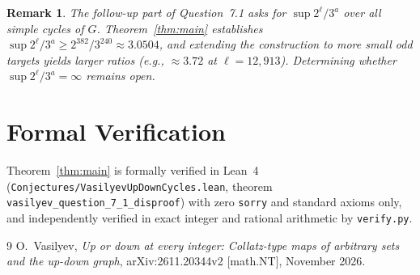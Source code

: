 \documentclass[11pt]{article}
\newtheorem{remark}[theorem]{Remark}
\begin{document}
\begin{remark}
The follow-up part of Question~7.1 asks for $\sup 2^\ell / 3^a$ over all simple cycles of $G$. Theorem~\ref{thm:main} establishes $\sup 2^\ell / 3^a \ge 2^{382}/3^{240} \approx 3.0504$, and extending the construction to more small odd targets yields larger ratios (e.g., $\approx 3.72$ at $\ell = 12{,}913$). Determining whether $\sup 2^\ell/3^a = \infty$ remains open.
\end{remark}

\section*{Formal Verification}
Theorem~\ref{thm:main} is formally verified in Lean~4 (\texttt{Conjectures/VasilyevUpDownCycles.lean}, theorem \texttt{vasilyev\_question\_7\_1\_disproof}) with zero \texttt{sorry} and standard axioms only, and independently verified in exact integer and rational arithmetic by \texttt{verify.py}.

\begin{thebibliography}{9}
O.~Vasilyev, \emph{Up or down at every integer: Collatz-type maps of arbitrary sets and the up-down graph}, arXiv:2611.20344v2 [math.NT], November 2026.
\end{thebibliography}
\end{document}
